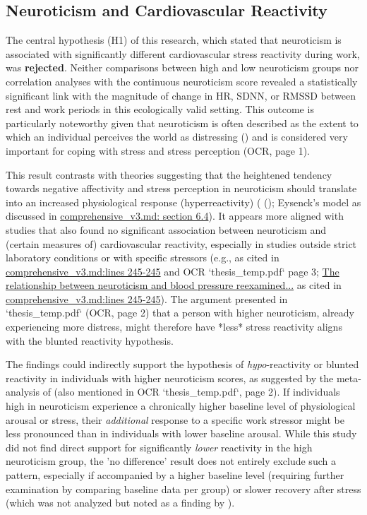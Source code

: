 \documentclass[11pt, a4paper]{report}
\newcommand{\pdfcite}[2]{\cite{#1} (\href{run:./papers/#2.pdf}{\texttt{\detokenize{#2.pdf}}})}
\newcommand{\mdcite}[3]{\href{run:./sources/#1}{\url{#1}:lines #2-#3}} %
\newcommand{\mdcitesec}[2]{\href{run:./sources/#1}{\url{#1}: section #2}}
\begin{document}
\subsection{Neuroticism and Cardiovascular Reactivity}
\label{subsec:discussion_h1_interp} %
The central hypothesis (H1) of this research, which stated that neuroticism is associated with significantly different cardiovascular stress reactivity during work, was \textbf{rejected}. Neither comparisons between high and low neuroticism groups nor correlation analyses with the continuous neuroticism score revealed a statistically significant link with the magnitude of change in HR, SDNN, or RMSSD between rest and work periods in this ecologically valid setting. This outcome is particularly noteworthy given that neuroticism is often described as the extent to which an individual perceives the world as distressing \pdfcite{Barlow_OriginsNeuroticism}{The_origins_of_neuroticism} and is considered very important for coping with stress and stress perception \cite{ThesisTempPDF} (OCR, page 1).

This result contrasts with theories suggesting that the heightened tendency towards negative affectivity and stress perception in neuroticism should translate into an increased physiological response (hyperreactivity) (\pdfcite{Barlow_OriginsNeuroticism}{The_origins_of_neuroticism}; Eysenck's model as discussed in \mdcitesec{comprehensive_v3.md}{6.4}). It appears more aligned with studies that also found no significant association between neuroticism and (certain measures of) cardiovascular reactivity, especially in studies outside strict laboratory conditions or with specific stressors (e.g., \cite{VerschoorMarkus2011} as cited in \mdcite{comprehensive_v3.md}{245}{245} and OCR `thesis_temp.pdf` page 3; \href{https://pubmed.ncbi.nlm.nih.gov/8248458/}{The relationship between neuroticism and blood pressure reexamined...} as cited in \mdcite{comprehensive_v3.md}{245}{245}). The argument presented in `thesis_temp.pdf` (OCR, page 2) that a person with higher neuroticism, already experiencing more distress, might therefore have *less* stress reactivity aligns with the blunted reactivity hypothesis.

The findings could indirectly support the hypothesis of \textit{hypo}-reactivity or blunted reactivity in individuals with higher neuroticism scores, as suggested by the meta-analysis of \cite{ChidaHamer2008} (also mentioned in OCR `thesis_temp.pdf`, page 2). If individuals high in neuroticism experience a chronically higher baseline level of physiological arousal or stress, their \textit{additional} response to a specific work stressor might be less pronounced than in individuals with lower baseline arousal. While this study did not find direct support for significantly \textit{lower} reactivity in the high neuroticism group, the 'no difference' result does not entirely exclude such a pattern, especially if accompanied by a higher baseline level (requiring further examination by comparing baseline data per group) or slower recovery after stress (which was not analyzed but noted as a finding by \cite{ChidaHamer2008}).
\end{document}
